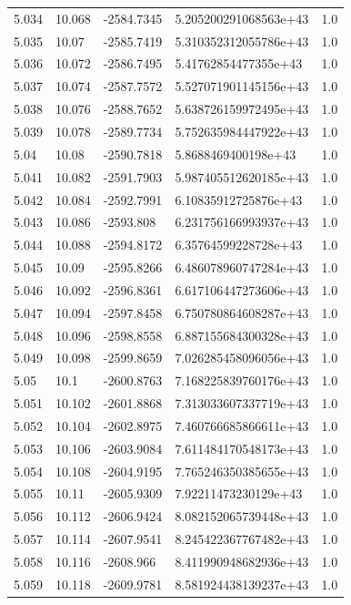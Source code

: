 \begin{tabular}{lllll}
5.034 & 10.068 & -2584.7345 & 5.205200291068563e+43 & 1.0 \\
5.035 & 10.07 & -2585.7419 & 5.310352312055786e+43 & 1.0 \\
5.036 & 10.072 & -2586.7495 & 5.41762854477355e+43 & 1.0 \\
5.037 & 10.074 & -2587.7572 & 5.527071901145156e+43 & 1.0 \\
5.038 & 10.076 & -2588.7652 & 5.638726159972495e+43 & 1.0 \\
5.039 & 10.078 & -2589.7734 & 5.752635984447922e+43 & 1.0 \\
5.04 & 10.08 & -2590.7818 & 5.8688469400198e+43 & 1.0 \\
5.041 & 10.082 & -2591.7903 & 5.987405512620185e+43 & 1.0 \\
5.042 & 10.084 & -2592.7991 & 6.10835912725876e+43 & 1.0 \\
5.043 & 10.086 & -2593.808 & 6.231756166993937e+43 & 1.0 \\
5.044 & 10.088 & -2594.8172 & 6.35764599228728e+43 & 1.0 \\
5.045 & 10.09 & -2595.8266 & 6.486078960747284e+43 & 1.0 \\
5.046 & 10.092 & -2596.8361 & 6.617106447273606e+43 & 1.0 \\
5.047 & 10.094 & -2597.8458 & 6.750780864608287e+43 & 1.0 \\
5.048 & 10.096 & -2598.8558 & 6.887155684300328e+43 & 1.0 \\
5.049 & 10.098 & -2599.8659 & 7.026285458096056e+43 & 1.0 \\
5.05 & 10.1 & -2600.8763 & 7.168225839760176e+43 & 1.0 \\
5.051 & 10.102 & -2601.8868 & 7.313033607337719e+43 & 1.0 \\
5.052 & 10.104 & -2602.8975 & 7.460766685866611e+43 & 1.0 \\
5.053 & 10.106 & -2603.9084 & 7.611484170548173e+43 & 1.0 \\
5.054 & 10.108 & -2604.9195 & 7.765246350385655e+43 & 1.0 \\
5.055 & 10.11 & -2605.9309 & 7.92211473230129e+43 & 1.0 \\
5.056 & 10.112 & -2606.9424 & 8.082152065739448e+43 & 1.0 \\
5.057 & 10.114 & -2607.9541 & 8.245422367767482e+43 & 1.0 \\
5.058 & 10.116 & -2608.966 & 8.411990948682936e+43 & 1.0 \\
5.059 & 10.118 & -2609.9781 & 8.581924438139237e+43 & 1.0 \\

\end{tabular}
